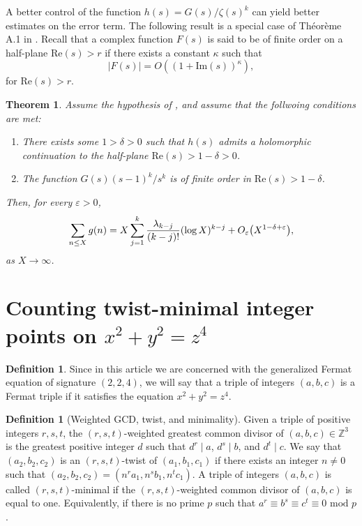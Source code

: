 \documentclass[12pt]{amsart}
\newcounter{counter}[section] %
\numberwithin{equation}{section} %
\newtheorem{theorem}[counter]{Theorem}
\theoremstyle{definition} \newtheorem{definition}[counter]{Definition}
\theoremstyle{remark} \newtheorem{nonexam}[counter]{Non-example}
\newcommand{\ZZ}{\mathbb{Z}} %
\newcommand{\md}{\text{ mod }} %
\newcommand{\cdef}[1]{\textsf{#1}} %
\renewcommand{\Re}{\mathrm{Re}} %
\renewcommand{\Im}{\mathrm{Im}} %
\let\originalleft\left \let\originalright\right
\renewcommand{\left}{\mathopen{}\mathclose\bgroup\originalleft}
\renewcommand{\right}{\aftergroup\egroup\originalright}
\begin{document}
A better control of the function $h(s) = G(s)/\zeta(s)^k$ can yield better
estimates on the error term. The following result is a special case of Théorème
A.1 in \cite{CL&T01}. Recall that a complex function $F(s)$ is said to be of
\cdef{finite order} on a half-plane $\Re(s) > r$ if there exists a constant
$\kappa$ such that
    \begin{equation}
        \label{eq:finite-order}
        |F(s)| = O((1+\Im(s))^\kappa),
    \end{equation}
for $\Re(s) > r$. 

\begin{theorem}
    \label{thm:tauberian2}
    Assume the hypothesis of , and assume that the
    follwoing conditions are met:
    \begin{enumerate}[label=(\roman*)]
    \item There exists some $1 > \delta > 0$ such that $h(s)$ admits a
      holomorphic continuation to the half-plane $\Re(s) > 1 - \delta > 0$.
        \item The function $G(s)(s-1)^k/s^{k}$ is of finite order in $\Re(s) > 1-\delta$.
    \end{enumerate}
    Then, for every $\varepsilon >0$, 
    \begin{equation*}
      \sum_{n\leq X} g(n) =
      X\sum_{j = 1}^k \dfrac{\lambda_{k-j}}{(k-j)!}(\log X)^{k-j}
      + O_\varepsilon\left(X^{1-\delta + \varepsilon}\right),
    \end{equation*}
    as $X \to \infty$.
\end{theorem}

\section{Counting twist-minimal integer points on $x^2 + y^2 = z^4$}
\label{sec:counting-twist-min-sols}

\begin{definition}
  \label{def:fermat-triple}
  Since in this article we are concerned with the generalized Fermat equation
  of signature $(2,2,4)$, we will say that a triple of integers $(a,b,c)$ is a
  \cdef{Fermat triple} if it satisfies the equation $x^2 + y^2 = z^4$.
\end{definition}

\begin{definition}[Weighted GCD, twist, and minimality]
  \label{def:weighted-stuff}
  Given a triple of positive integers $r,s,t$, the \cdef{$(r,s,t)$-weighted
  greatest common divisor} of $(a,b,c)\in \ZZ^3$ is the greatest positive
  integer $d$ such that $d^r\mid a$, $d^s \mid b$, and $d^t \mid c$. We say
  that $(a_2,b_2,c_2)$ is an \cdef{$(r,s,t)$-twist} of $(a_1,b_1,c_1)$ if
  there exists an integer $n \neq 0$ such that
  $(a_2,b_2,c_2) = (n^ra_1,n^sb_1,n^tc_1)$. A triple of integers $(a,b,c)$ is
  called \cdef{$(r,s,t)$-minimal} if the $(r,s,t)$-weighted common divisor of
  $(a,b,c)$ is equal to one. Equivalently, if there is no prime $p$ such that
  $a^r \equiv b^s \equiv c^t \equiv 0 \md p$.
\end{definition}
\end{document}
